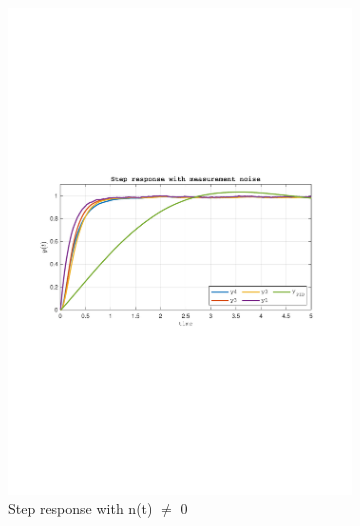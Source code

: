 \documentclass[a4paper, 12pt]{article}
\begin{document}
\begin{figure}[h!]
    \begin{subfigure}[t]{0.60\textwidth}
           \includegraphics[width=\textwidth]{Figures/fig09a.pdf}
           \caption{Step response with n(t) $\neq$ 0}
           \label{fig:fig09a}
       \end{subfigure}
    \begin{subfigure}[t]{0.4\textwidth}

\end{subfigure}
\end{figure}
\end{document}
